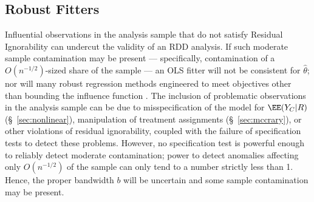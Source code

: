 


\subsection{Robust Fitters}\label{sec:robustFitters}
Influential observations in the analysis sample that do not satisfy Residual
Ignorability %
 can undercut the validity of an RDD analysis.
If such moderate sample contamination may be present --- specifically, contamination of
a $O(n^{-1/2})$-sized
share of the sample --- an OLS fitter will not be consistent for $\hat{\theta}$;
nor will many robust regression methods engineered to meet
objectives other than bounding the influence function
\citep{stefanski1991note}.
The inclusion of problematic observations in the analysis sample can
be due to misspecification of the model for $\EE (Y_{C}|R)$
(\S~\ref{sec:nonlinear}), manipulation of treatment assignments
(\S~\ref{sec:mccrary}), or other violations of residual ignorability,
coupled with the failure of specification tests to detect these problems.
However, no specification test is powerful enough
to reliably detect moderate contamination; power to detect anomalies
affecting only $O(n^{-1/2})$ of the sample can only tend to a number
strictly less than 1.
Hence, the
proper bandwidth $b$ will be uncertain
and some sample contamination may be present.

